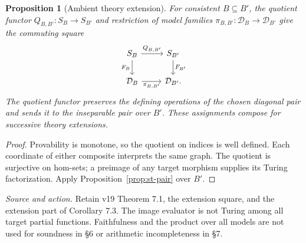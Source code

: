 \documentclass[11pt]{article}
\newtheorem{proposition}[theorem]{Proposition}
\theoremstyle{definition}\newtheorem{definition}[theorem]{Definition}
\newcommand{\D}{\mathcal D}
\newcommand{\source}[1]{\par\smallskip\noindent\textit{Source and action.} #1\par\smallskip}
\begin{document}
\begin{proposition}[Ambient theory extension]
For consistent $B\subseteq B'$, the quotient functor
$Q_{B,B'}:S_B\to S_{B'}$ and restriction of model families
$\pi_{B,B'}:\D_B\to\D_{B'}$ give the commuting square
\[
\begin{tikzcd}
 S_B\arrow[r,"Q_{B,B'}"]\arrow[d,"F_B"'] & S_{B'}\arrow[d,"F_{B'}"]\\
 \D_B\arrow[r,"\pi_{B,B'}"'] & \D_{B'}.
\end{tikzcd}
\]
The quotient functor preserves the defining operations of the
chosen diagonal pair and sends it to the inseparable pair over
$B'$. These assignments compose for successive theory extensions.
\end{proposition}
\begin{proof}
Provability is monotone, so the quotient on indices is well defined.
Each coordinate of either composite interprets the same graph.
The quotient is surjective on hom-sets; a preimage of any target
morphism supplies its Turing factorization. Apply
Proposition~\ref{prop:st-pair} over $B'$.
\end{proof}
\source{Retain v19 Theorem 7.1, the extension square, and the extension part of Corollary 7.3. The image evaluator is not Turing among all target partial functions. Faithfulness and the product over all models are not used for soundness in \S6 or arithmetic incompleteness in \S7.}
\end{document}
